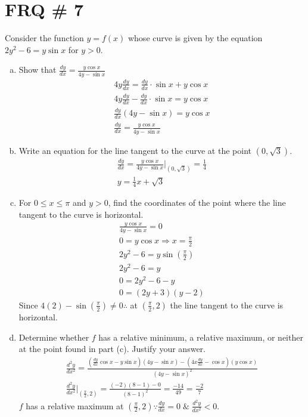 \documentclass[11pt,letterpaper]{article}
\begin{document}
\section*{FRQ \# 7}
Consider the function $y = f(x)$ whose curve is given by the equation $2y^2-6 = y \sin x$ for $y > 0$.
\begin{enumerate}[a.)]
    \item Show that $\frac{dy}{dx}=\frac{y\cos x}{4y-\sin x}$
    \begin{align*}
        4y\frac{dy}{dx}=\frac{dy}{dx} \cdot \sin x + y\cos x\\
        4y\frac{dy}{dx}-\frac{dy}{dx} \cdot \sin x = y\cos x\\
        \frac{dy}{dx}(4y-\sin x) = y\cos x\\
        \frac{dy}{dx} = \frac{y\cos x}{4y-\sin x}
    \end{align*}
    \newpage
    \item Write an equation for the line tangent to the curve at the point $(0, \sqrt{3})$.
    \begin{align*}
        \frac{dy}{dx} =\frac{y\cos x}{4y-\sin x} \biggr\rvert_{(0, \sqrt{3})} = \frac{1}{4}\\
        y=\frac{1}{4}x+\sqrt{3}
    \end{align*}
    \item For $0 \leq x  \leq \pi $ and $y > 0$, find the coordinates of the point where the line tangent to the curve is horizontal.
    \begin{align*}
        \frac{y\cos x}{4y-\sin x}=0 \\ 
        0=y\cos x \Rightarrow x=\frac{\pi}{2}\\
        2y^2-6=y\sin(\frac{\pi}{2})\\
         2y^2-6=y \\
         0=2y^2-6-y\\
         0=(2y+3)(y-2)
    \end{align*}
     Since $4(2)-\sin(\frac{\pi}{2})\neq0 \therefore$ at $(\frac{\pi}{2}, 2)$ the line tangent to the curve is horizontal.
     \item Determine whether $f$ has a relative minimum, a relative maximum, or neither at the point found in part (c). Justify your answer.
     \begin{align*}
         \frac{d^2y}{dx^2}=\frac{(\frac{dy}{dx} \cos x -y\sin x)(4y-\sin x)-(4x\frac{dy}{dx}-\cos x)(y\cos x)}{(4y-\sin x)^2}\\
        \frac{d^2y}{dx^2}\biggr\rvert_{(\frac{\pi}{2}, 2)} = \frac{(-2)(8-1)-0}{(8-1)^2}=\frac{-14}{49}=\frac{-2}{7}
     \end{align*}
     $f$ has a relative maximum at $(\frac{\pi}{2}, 2) \because \frac{dy}{dx}=0 \; \& \; \frac{d^2y}{dx^2}<0$. 
\end{enumerate}
\newpage
\end{document}
